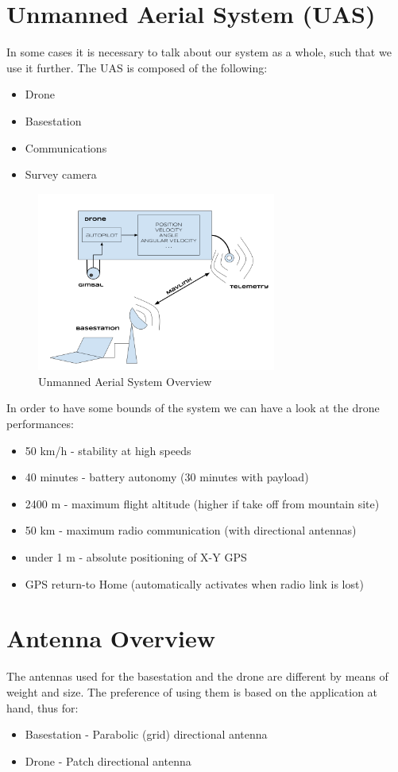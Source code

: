 \section*{Unmanned Aerial System (UAS)}
In some cases it is necessary to talk about our system as a whole, such that we use it further. The UAS is composed of the following:
\begin{itemize}
	\item Drone
	\item Basestation
	\item Communications
	\item Survey camera
\end{itemize}

\begin{figure}[h!]\label{fig:uas}
	\centering
	\includegraphics[width=0.7\textwidth]{figures/uas.png}
	\caption{Unmanned Aerial System Overview}
\end{figure}

In order to have some bounds of the system we can have a look at the drone performances:
\begin{itemize}
	\item 50 km/h - stability at high speeds 
	\item 40 minutes - battery autonomy (30 minutes with payload)
	\item 2400 m - maximum flight altitude (higher if take off from mountain site)
	\item 50 km - maximum radio communication (with directional antennas)
	\item under 1 m - absolute positioning of X-Y GPS
	\item GPS return-to Home (automatically activates when radio link is lost)
\end{itemize}

\section*{Antenna Overview}
The antennas used for the basestation and the drone are different by means of weight and size. The preference of using them is based on the application at hand, thus for:
\begin{itemize}
	\item Basestation - Parabolic (grid) directional antenna 
	\item Drone - Patch directional antenna
\end{itemize}

